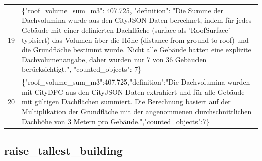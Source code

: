 \documentclass[a4paper,11pt]{article}
\begin{document}
\begin{table}[ht]
\begin{tabular}{r p{12cm}}
19 & \{"roof\_volume\_sum\_m3": 407.725, "definition": "Die Summe der Dachvolumina wurde aus den CityJSON-Daten berechnet, indem für jedes Gebäude mit einer definierten Dachfläche (surface als 'RoofSurface' typisiert) das Volumen über die Höhe (distance from ground to roof) und die Grundfläche bestimmt wurde. Nicht alle Gebäude hatten eine explizite Dachvolumenangabe, daher wurden nur 7 von 36 Gebäuden berücksichtigt.", "counted\_objects": 7\} \\
20 & \{"roof\_volume\_sum\_m3":407.725,"definition":"Die Dachvolumina wurden mit CityDPC aus den CityJSON-Daten extrahiert und für alle Gebäude mit gültigen Dachflächen summiert. Die Berechnung basiert auf der Multiplikation der Grundfläche mit der angenommenen durchschnittlichen Dachhöhe von 3 Metern pro Gebäude.","counted\_objects":7\} \\
\hline
\end{tabular}
\end{table}

\clearpage
\subsection{raise\_tallest\_building}
\end{document}
